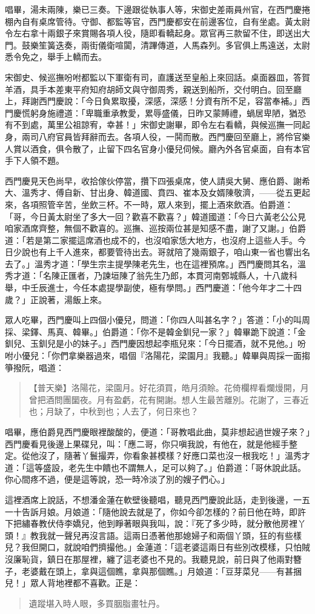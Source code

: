 唱畢，湯未兩陳，樂已三奏。下邊跟從執事人等，宋御史差兩員州官，在西門慶捲棚內自有桌席管待。守御、都監等官，西門慶都安在前邊客位，自有坐處。黃太尉令左右拿十兩銀子來賞賜各項人役，隨即看轎起身。眾官再三款留不住，即送出大門。鼓樂笙簧迭奏，兩街儀衛喧闐，清蹕傳道，人馬森列。多官俱上馬遠送，太尉悉令免之，舉手上轎而去。

宋御史、候巡撫吩咐都監以下軍衛有司，直護送至皇船上來回話。桌面器皿，答賀羊酒，具手本差東平府知府胡師文與守御周秀，親送到船所，交付明白。回至廳上，拜謝西門慶說：「今日負累取擾，深感，深感！分資有所不足，容當奉補。」西門慶慌躬身施禮道：「卑職重承教愛，累辱盛儀，日昨又蒙賻禮，蝸居卑陋，猶恐有不到處，萬里公祖諒宥，幸甚！」宋御史謝畢，即令左右看轎，與候巡撫一同起身，兩司八府官員皆拜辭而去。各項人役，一鬨而散。西門慶回至廳上，將伶官樂人賞以酒食，俱令散了，止留下四名官身小優兒伺候。廳內外各官桌面，自有本官手下人領不題。

西門慶見天色尚早，收拾傢伙停當，攢下四張桌席，使人請吳大舅、應伯爵、謝希大、溫秀才、傅自新、甘出身、韓道國、賁四、崔本及女婿陳敬濟，——從五更起來，各項照管辛苦，坐飲三杯。不一時，眾人來到，擺上酒來飲酒。伯爵道：「哥，今日黃太尉坐了多大一回？歡喜不歡喜？」韓道國道：「今日六黃老公公見咱家酒席齊整，無個不歡喜的。巡撫、巡按兩位甚是知感不盡，謝了又謝。」伯爵道：「若是第二家擺這席酒也成不的，也沒咱家恁大地方，也沒府上這些人手。今日少說也有上千人進來，都要管待出去。哥就陪了幾兩銀子，咱山東一省也響出名去了。」溫秀才道：「學生宗主提學陳老先生，也在這裡預席。」西門慶問其名，溫秀才道：「名陳正匯者，乃諫垣陳了翁先生乃郎，本貫河南鄄城縣人，十八歲科舉，中壬辰進士，今任本處提學副使，極有學問。」西門慶道：「他今年才二十四歲？」正說著，湯飯上來。

眾人吃畢，西門慶叫上四個小優兒，問道：「你四人叫甚名字？」答道：「小的叫周採、梁鐸、馬真、韓畢。」伯爵道：「你不是韓金釧兒一家？」韓畢跪下說道：「金釧兒、玉釧兒是小的妹子。」西門慶因想起李瓶兒來：「今日擺酒，就不見他。」吩咐小優兒：「你們拿樂器過來，唱個『洛陽花，梁園月』我聽。」韓畢與周採一面搊箏撥阮，唱道：
\begin{quote}
【普天樂】洛陽花，梁園月。好花須買，皓月須賒。花倚欄桿看爛熳開，月曾把酒問團圞夜。月有盈虧，花有開謝。想人生最苦離別。花謝了，三春近也；月缺了，中秋到也；人去了，何日來也？
\end{quote}

唱畢，應伯爵見西門慶眼裡酸酸的，便道：「哥教唱此曲，莫非想起過世嫂子來？」西門慶看見後邊上果碟兒，叫：「應二哥，你只嗔我說，有他在，就是他經手整定。從他沒了，隨著丫鬟撮弄，你看象甚模樣？好應口菜也沒一根我吃！」溫秀才道：「這等盛設，老先生中饋也不謂無人，足可以夠了。」伯爵道：「哥休說此話。你心間疼不過，便是這等說，恐一時冷淡了別的嫂子們心。」

這裡酒席上說話，不想潘金蓮在軟壁後聽唱，聽見西門慶說此話，走到後邊，一五一十告訴月娘。月娘道：「隨他說去就是了，你如今卻怎樣的？前日他在時，即許下把繡春教伏侍李嬌兒，他到睜著眼與我叫，說：『死了多少時，就分散他房裡丫頭！』教我就一聲兒再沒言語。這兩日憑著他那媳婦子和兩個丫頭，狂的有些樣兒？我但開口，就說咱們擠撮他。」金蓮道：「這老婆這兩日有些別改模樣，只怕賊沒廉恥貨，鎮日在那屋裡，纏了這老婆也不見的。我聽見說，前日與了他兩對簪子，老婆戴在頭上，拿與這個瞧，拿與那個瞧。」月娘道：「豆芽菜兒——有甚捆兒！」眾人背地裡都不喜歡。正是：
\begin{quote}
遺蹤堪入時人眼，多買胭脂畫牡丹。
\end{quote}
